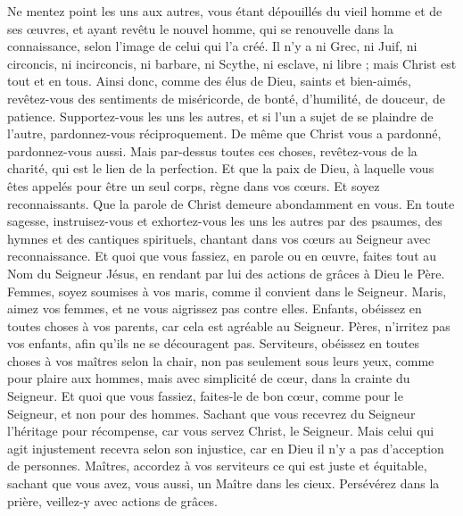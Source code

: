 \begin{multicols}{2}
Ne mentez point les uns aux autres, vous étant dépouillés du vieil homme et de ses œuvres,
et ayant revêtu le nouvel homme, qui se renouvelle dans la connaissance, selon l'image de celui qui l'a créé.
Il n'y a ni Grec, ni Juif, ni circoncis, ni incirconcis, ni barbare, ni Scythe, ni esclave, ni libre ; mais Christ est tout et en tous.
Ainsi donc, comme des élus de Dieu, saints et bien-aimés, revêtez-vous des sentiments de miséricorde, de bonté, d'humilité, de douceur, de patience.
Supportez-vous les uns les autres, et si l’un a sujet de se plaindre de l’autre, pardonnez-vous réciproquement. De même que Christ vous a pardonné, pardonnez-vous aussi.
Mais par-dessus toutes ces choses, revêtez-vous de la charité, qui est le lien de la perfection.
Et que la paix de Dieu, à laquelle vous êtes appelés pour être un seul corps, règne dans vos cœurs. Et soyez reconnaissants.
Que la parole de Christ demeure abondamment en vous. En toute sagesse, instruisez-vous et exhortez-vous les uns les autres par des psaumes, des hymnes et des cantiques spirituels, chantant dans vos cœurs au Seigneur avec reconnaissance.
Et quoi que vous fassiez, en parole ou en œuvre, faites tout au Nom du Seigneur Jésus, en rendant par lui des actions de grâces à Dieu le Père.
Femmes, soyez soumises à vos maris, comme il convient dans le Seigneur.
Maris, aimez vos femmes, et ne vous aigrissez pas contre elles.
Enfants, obéissez en toutes choses à vos parents, car cela est agréable au Seigneur.
Pères, n'irritez pas vos enfants, afin qu'ils ne se découragent pas.
Serviteurs, obéissez en toutes choses à vos maîtres selon la chair, non pas seulement sous leurs yeux, comme pour plaire aux hommes, mais avec simplicité de cœur, dans la crainte du Seigneur.
Et quoi que vous fassiez, faites-le de bon cœur, comme pour le Seigneur, et non pour des hommes.
Sachant que vous recevrez du Seigneur l’héritage pour récompense, car vous servez Christ, le Seigneur.
Mais celui qui agit injustement recevra selon son injustice, car en Dieu il n'y a pas d’acception de personnes.
\VerseOne{}Maîtres, accordez à vos serviteurs ce qui est juste et équitable, sachant que vous avez, vous aussi, un Maître dans les cieux.
Persévérez dans la prière, veillez-y avec actions de grâces.

\end{multicols}
